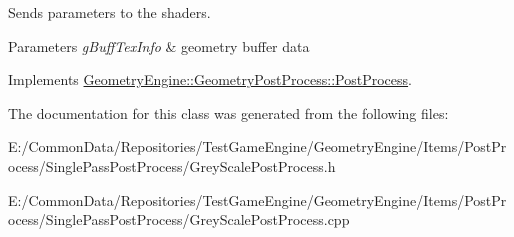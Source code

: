 Sends parameters to the shaders. 
\begin{DoxyParams}{Parameters}
{\em g\+Buff\+Tex\+Info} & geometry buffer data \\
\hline
\end{DoxyParams}


Implements \mbox{\hyperlink{class_geometry_engine_1_1_geometry_post_process_1_1_post_process_ae4bd80f5d0f0768fd4e2141a95ff5bb0}{Geometry\+Engine\+::\+Geometry\+Post\+Process\+::\+Post\+Process}}.



The documentation for this class was generated from the following files\+:\begin{DoxyCompactItemize}
\item 
E\+:/\+Common\+Data/\+Repositories/\+Test\+Game\+Engine/\+Geometry\+Engine/\+Items/\+Post\+Process/\+Single\+Pass\+Post\+Process/Grey\+Scale\+Post\+Process.\+h\item 
E\+:/\+Common\+Data/\+Repositories/\+Test\+Game\+Engine/\+Geometry\+Engine/\+Items/\+Post\+Process/\+Single\+Pass\+Post\+Process/Grey\+Scale\+Post\+Process.\+cpp\end{DoxyCompactItemize}
